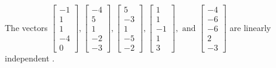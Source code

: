 \begin{exercise}
\begin{exerciseStatement}
  \end{exerciseStatement}
  \begin{exerciseAnswer}
   The vectors \(\left[\begin{array}{r}
-1 \\
1 \\
1 \\
-4 \\
0
\end{array}\right] , \left[\begin{array}{r}
-4 \\
5 \\
1 \\
-2 \\
-3
\end{array}\right] , \left[\begin{array}{r}
5 \\
-3 \\
1 \\
-5 \\
-2
\end{array}\right] , \left[\begin{array}{r}
1 \\
1 \\
-1 \\
1 \\
3
\end{array}\right] , \text{ and } \left[\begin{array}{r}
-4 \\
-6 \\
-6 \\
2 \\
-3
\end{array}\right]\) are 
  	 linearly independent  .
  


  \end{exerciseAnswer}
\end{exercise}